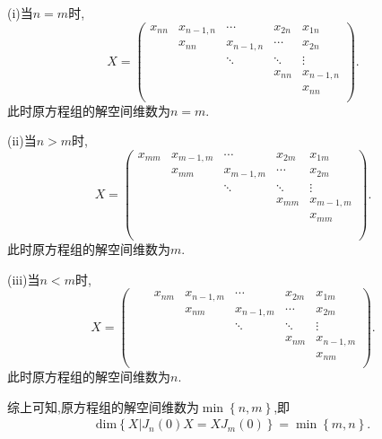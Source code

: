 \documentclass[../../main.tex]{subfiles}%
\begin{document}
\begin{solution}
(i)当$n=m$时,
\[
X=\left( \begin{matrix}
x_{nn}&		x_{n-1,n}&		\cdots&		x_{2n}&		x_{1n}\\
&		x_{nn}&		x_{n-1,n}&		\cdots&		x_{2n}\\
&		&		\ddots&		\ddots&		\vdots\\
&		&		&		x_{nn}&		x_{n-1,n}\\
&		&		&		&		x_{nn}\\
\end{matrix} \right) .
\] 
此时原方程组的解空间维数为$n=m$.

(ii)当$n>m$时,
\[
X=\left( \begin{matrix}
x_{mm}&		x_{m-1,m}&		\cdots&		x_{2m}&		x_{1m}\\
&		x_{mm}&		x_{m-1,m}&		\cdots&		x_{2m}\\
&		&		\ddots&		\ddots&		\vdots\\
&		&		&		x_{mm}&		x_{m-1,m}\\
&		&		&		&		x_{mm}\\
&		&		&		&		\\
&		&		&		&		\\
\end{matrix} \right) .
\] 
此时原方程组的解空间维数为$m$.

(iii)当$n<m$时,
\[
X=\left( \begin{matrix}
	&		&		x_{nm}&		x_{n-1,m}&		\cdots&		x_{2m}&		x_{1m}\\
	&		&		&		x_{nm}&		x_{n-1,m}&		\cdots&		x_{2m}\\
	&		&		&		&		\ddots&		\ddots&		\vdots\\
	&		&		&		&		&		x_{nm}&		x_{n-1,m}\\
	&		&		&		&		&		&		x_{nm}\\
\end{matrix} \right) .
\] 
此时原方程组的解空间维数为$n $.

综上可知,原方程组的解空间维数为$\min \left\{ n,m \right\} $,即
\begin{align*}
\mathrm{dim}\left\{ X|J_n\left( 0 \right) X=XJ_m\left( 0 \right) \right\} =\min \left\{ m,n \right\} .
\end{align*}

\end{solution}
\end{document}
